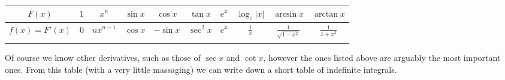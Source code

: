 \begin{center}
\renewcommand{\arraystretch}{1.3}
   \begin{tabular}{!{\vrule width 1pt}c!{\vrule width
1pt}c|c|c|c|c|c|c|c|c!{\vrule width 1pt}}
        $F(x)$  & $1$ & $x^n$      & $\sin x$ & $\cos x$ & $\tan x$ &
$e^x$ & $\log_e|x|$       & $\arcsin x$             & $\arctan x$ \\    \hline
        $f(x)=F'(x)$ & $0$ & $nx^{n-1}$ & $\cos x$ & $-\sin x$ & $\sec^2 x$ &
$e^x$ & $\frac{1}{x}$ &
$\frac{1}{\sqrt{1-x^2}}$
      & $\frac{1}{1+x^2}$ \\
     \end{tabular}
\renewcommand{\arraystretch}{1.0}
\end{center}
Of course we know other derivatives, such as those of $\sec x$ and $\cot x$, however the
ones listed above are arguably the most important ones. From this table (with a very
little massaging) we can write down a short table of indefinite integrals.
